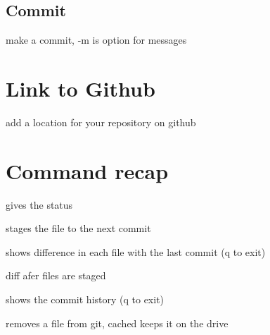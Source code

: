 

	\subsection{Commit}

		 make a commit, -m is option for messages


\section{Link to Github}

	 add a location for your repository on github



\section{Command recap}

	 gives the status

	 stages the file to the next commit

	 shows difference in each file with the last commit (q to exit)

	 diff afer files are staged

	 shows the commit history (q to exit)

	 removes a file from git, cached keeps it on the drive